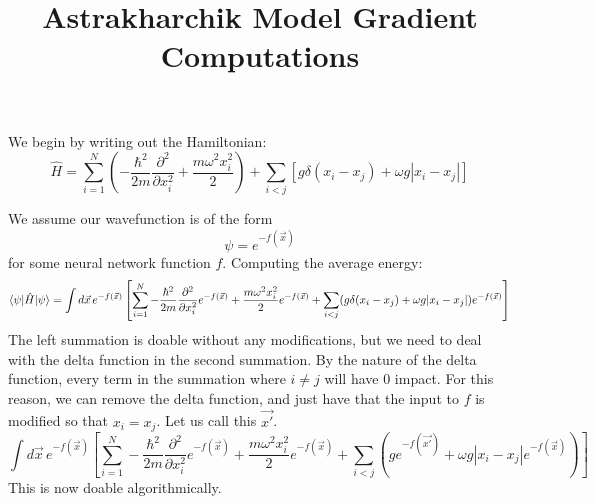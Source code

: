 \documentclass{notes}
\title{Astrakharchik Model Gradient Computations}
\date{}
\begin{document}
	We begin by writing out the Hamiltonian:
	$$\hat{H} = \sum_{i=1}^N \left(-\frac{\hbar^2}{2m}\frac{\partial^2}{\partial x_i^2} + \frac{m\omega^2x_i^2}{2}\right) + \sum_{i<j}\left[g\delta(x_i - x_j) + \omega g |x_i - x_j|\right]$$

	We assume our wavefunction is of the form
	$$\psi = e^{-f(\vec{x})}$$
	for some neural network function $f$. Computing the average energy:
	$$\braket{\psi|\hat{H}|\psi} = \int d\vec{x}\, e^{-f(\vec{x})} \left[\sum_{i=1}^N -\frac{\hbar^2}{2m}\frac{\partial^2}{\partial x_i^2}e^{-f(\vec{x})} + \frac{m\omega^2 x_i^2}{2}e^{-f(\vec{x})} + \sum_{i<j}(g\delta(x_i-x_j) + \omega g|x_i - x_j|)e^{-f(\vec{x})}\right]$$
	The left summation is doable without any modifications, but we need to deal with the delta function in the second summation. By the nature of the delta function, every term in the summation where $i \neq j$ will have 0 impact. For this reason, we can remove the delta function, and just have that the input to $f$ is modified so that $x_i = x_j$. Let us call this $\vec{x'}$.
	$$\int d\vec{x}\, e^{-f(\vec{x})} \left[\sum_{i=1}^N -\frac{\hbar^2}{2m}\frac{\partial^2}{\partial x_i^2}e^{-f(\vec{x})} + \frac{m\omega^2 x_i^2}{2}e^{-f(\vec{x})} + \sum_{i<j}\left(ge^{-f(\vec{x'})} + \omega g|x_i - x_j|e^{-f(\vec{x})}\right)\right]$$
	This is now doable algorithmically.
\end{document}
